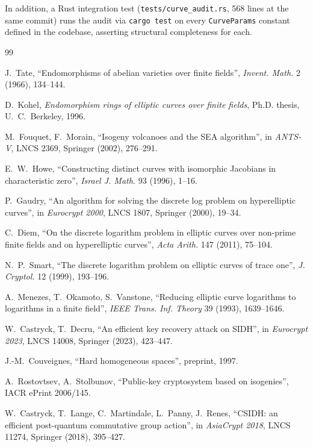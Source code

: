 \documentclass[11pt,a4paper]{article}
\theoremstyle{definition}
\begin{document}
In addition, a Rust integration test
(\texttt{tests/curve\_audit.rs}, 568 lines at the same commit) runs the audit
via \texttt{cargo test} on every \texttt{CurveParams} constant
defined in the codebase, asserting structural completeness for each.

\begin{thebibliography}{99}

 J.~Tate, ``Endomorphisms of abelian varieties
over finite fields'', \emph{Invent. Math.} 2 (1966), 134--144.

 D.~Kohel, \emph{Endomorphism rings of elliptic
curves over finite fields}, Ph.D. thesis, U.~C.~Berkeley, 1996.

 M.~Fouquet, F.~Morain, ``Isogeny
volcanoes and the SEA algorithm'', in \emph{ANTS-V}, LNCS 2369,
Springer (2002), 276--291.

 E.~W.~Howe, ``Constructing distinct curves with
isomorphic Jacobians in characteristic zero'', \emph{Israel J. Math.}
93 (1996), 1--16.

 P.~Gaudry, ``An algorithm for solving the
discrete log problem on hyperelliptic curves'', in \emph{Eurocrypt
2000}, LNCS 1807, Springer (2000), 19--34.

 C.~Diem, ``On the discrete logarithm problem in
elliptic curves over non-prime finite fields and on hyperelliptic
curves'', \emph{Acta Arith.} 147 (2011), 75--104.

 N.~P.~Smart, ``The discrete logarithm problem
on elliptic curves of trace one'', \emph{J. Cryptol.} 12 (1999),
193--196.

 A.~Menezes, T.~Okamoto, S.~Vanstone, ``Reducing
elliptic curve logarithms to logarithms in a finite field'',
\emph{IEEE Trans. Inf. Theory} 39 (1993), 1639--1646.

 W.~Castryck, T.~Decru, ``An efficient
key recovery attack on SIDH'', in \emph{Eurocrypt 2023}, LNCS
14008, Springer (2023), 423--447.

 J.-M.~Couveignes, ``Hard homogeneous
spaces'', preprint, 1997.

 A.~Rostovtsev, A.~Stolbunov,
``Public-key cryptosystem based on isogenies'', IACR ePrint
2006/145.

 W.~Castryck, T.~Lange, C.~Martindale, L.~Panny,
J.~Renes, ``CSIDH: an efficient post-quantum commutative group
action'', in \emph{AsiaCrypt 2018}, LNCS 11274, Springer (2018),
395--427.


\end{thebibliography}
\end{document}
